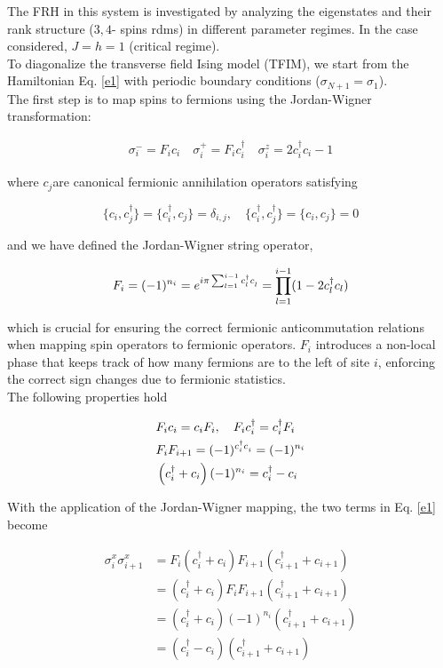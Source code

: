 \documentclass{article}
\newcommand{\phdag}{{\vphantom{\dagger}}}
\begin{document}
The FRH in this system is investigated by analyzing the eigenstates and their rank structure ($3,4$- spins rdms) in different parameter regimes. In the case considered, $J=h=1$ (critical regime).\\
To diagonalize the transverse field Ising model (TFIM), we start from the Hamiltonian Eq. \eqref{e1} with periodic boundary conditions ($\sigma_{N+1} = \sigma_1$).\\
The first step is to map spins to fermions using the Jordan-Wigner transformation:
 
\begin{align} 
\sigma^-_i = F_i c_i \quad \sigma^+_i = F_i c^\dagger_i \quad \sigma^{z}_i = 2 c^\dagger_i c_i - 1
\end{align} 

where $c_j$​ are canonical fermionic annihilation operators satisfying
 
\begin{equation}
\{c_i , c_j^\dag \}=\{c^\dag_i ​, c_j​\}=\delta_{i,j}, \quad \{c^\dag_i , c_j^\dag \}=\{c_i ​, c_j​\}=0
\end{equation}

and we have defined the Jordan-Wigner string operator, 

\begin{equation}
F_i = (-1)^{n_i} = e^{i\pi\sum_{l=1}^{i-1} c^\dag _l c^\phdag_l}= \prod_{l=1}^{i-1} (1 - 2 c^\dagger_l c_l)
\end{equation}

which is crucial for ensuring the correct fermionic anticommutation relations when mapping spin operators to fermionic operators. $F_i$ introduces a non-local phase that keeps track of how many fermions are to the left of site $i$, enforcing the correct sign changes due to fermionic statistics.\\
The following properties hold

\begin{align}
&F_i c_i = c_i F_i, \quad F_i c^\dag_i = c^\dag_i F_i \\
&F_i F_{i+1} = (-1)^{c^\dag_i c^\phdag_i} = (-1)^{n_i}\\
&\left( c^\dag_i + c_i\right) (-1)^{n_i} = c^\dag_i - c_i
\end{align}

With the application of the Jordan-Wigner mapping, the two terms in Eq. \eqref{e1} become

\begin{align}
 \sigma^x_i \sigma^x_{i+1} &= F_i \left( c^\dag_i + c_i\right) F_{i+1} \left( c^\dag_{i+1} + c_{i+1}\right)\\
 &= \left( c^\dag_i + c_i\right) F_i F_{i+1} \left( c^\dag_{i+1} + c_{i+1}\right)\\
 &= \left( c^\dag_i + c_i\right) (-1)^{n_i} \left( c^\dag_{i+1} + c_{i+1}\right)\\
 &= \left( c^\dag_i - c_i\right) \left( c^\dag_{i+1} + c_{i+1}\right)
\end{align}
\end{document}
